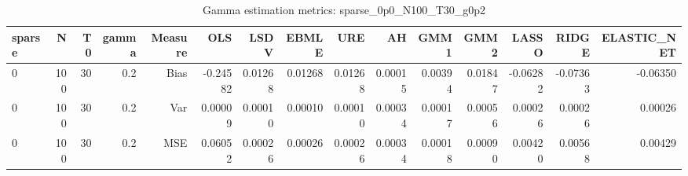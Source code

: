 \begin{table}[!htbp]\centering
\caption{Gamma estimation metrics: sparse_0p0_N100_T30_g0p2}
\label{tab:table1_sparse_0p0_N100_T30_g0p2}
\begin{tabular}{lrrrrrrrrrrrrrr}
\hline
sparse & N & T0 & gamma & Measure & OLS & LSDV & EBMLE & URE & AH & GMM1 & GMM2 & LASSO & RIDGE & ELASTIC_NET \\
\hline
0 & 100 & 30 & 0.2 & Bias & -0.24582 & 0.01268 & 0.01268 & 0.01268 & 0.00015 & 0.00394 & 0.01847 & -0.06282 & -0.07363 & -0.06350 \\
0 & 100 & 30 & 0.2 & Var & 0.00009 & 0.00010 & 0.00010 & 0.00010 & 0.00034 & 0.00017 & 0.00056 & 0.00026 & 0.00026 & 0.00026 \\
0 & 100 & 30 & 0.2 & MSE & 0.06052 & 0.00026 & 0.00026 & 0.00026 & 0.00034 & 0.00018 & 0.00090 & 0.00420 & 0.00568 & 0.00429 \\
\hline
\end{tabular}
\end{table}


